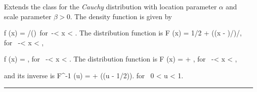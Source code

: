
Extends the class  for
the {\em Cauchy\/} distribution \cite[page 299]{tJOH95a}
with location parameter $\alpha$
and scale parameter $\beta > 0$.
The density function is given by
\begin{htmlonly}
\eq
  f (x) = \beta/()\mbox{ for }-\infty < x < \infty.
\endeq
The distribution function is
\eq
  F (x) = 1/2 + \arctan ((x - \alpha)/\beta)/\pi,
 \qquad \qquad  \mbox{for } -\infty < x < \infty,
\endeq
\end{htmlonly}
\begin{latexonly}
\eq
    f (x) = ,
            \qquad \qquad  \mbox{for } -\infty < x < \infty . 
\endeq
The distribution function is
\eq
  F (x) =  + ,
 \qquad \qquad  \mbox{for } -\infty < x < \infty,
\endeq
\end{latexonly}
and its inverse is
\eq
F^{-1} (u) = \alpha + \beta\tan (\pi(u - 1/2)).
\qquad \mbox{for } 0 < u < 1.
\endeq

\bigskip\hrule\bigskip

